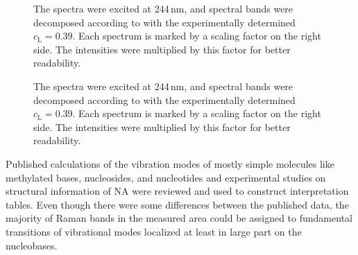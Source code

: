 \begin{figure}
	\centering
	
	\caption[%
		Spectra of AMP, TMP and poly(dAdT) obtained at 5\,\textdegree{}C and
		95\,\textdegree{}C.
	]{%
		The spectra were excited at 244\,nm, and spectral bands were decomposed
		according to
		with the experimentally determined
		$c_\text{L} = 0.39$.
		Each spectrum is marked by a scaling factor on the right side.
		The intensities were multiplied by this factor for better readability.}
	\label{\figlabel{interpretation:at}}
\end{figure}

\begin{figure}
	\centering
	
	\caption[%
			Spectra of GMP, polyC, poly(G) and polyG$\cdot$polyC obtained at
			5\,\textdegree{}C and 95\,\textdegree{}C.
	]{%
		The spectra were excited at 244\,nm, and spectral bands were decomposed
		according to
		with the experimentally determined
		$c_\text{L} = 0.39$.
		Each spectrum is marked by a scaling factor on the right side.
		The intensities were multiplied by this factor for better readability.}
	\label{\figlabel{interpretation:gc}}
\end{figure}

Published calculations of the vibration modes of mostly simple molecules like
methylated bases, nucleosides, and nucleotides and experimental studies on
structural information of NA were reviewed and used to construct
interpretation tables.
Even though there were some differences between the published data, the
majority of Raman bands in the measured area could be assigned to fundamental
transitions of vibrational modes localized at least in large part on the
nucleobases.
